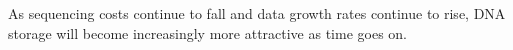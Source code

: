 \documentclass[a4paper,conference]{IEEEtran}
\begin{document}
As sequencing costs continue to fall and data growth rates continue to rise, DNA storage will become increasingly more attractive as time goes on. 





%
%
%
\end{document}
